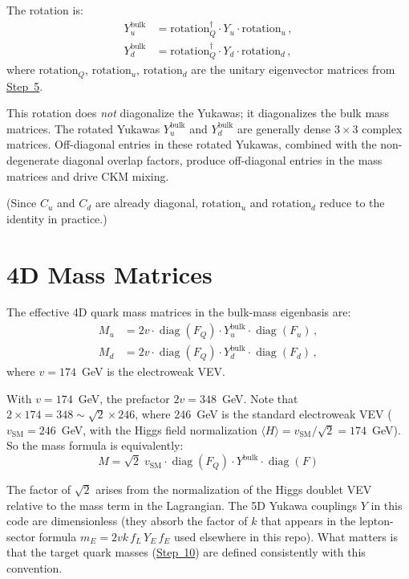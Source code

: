 \documentclass[11pt]{article}
\begin{document}
The rotation is:
\begin{align}
  Y_u^{\mathrm{bulk}} &= \text{rotation}_Q^\dagger \cdot Y_u
    \cdot \text{rotation}_u\,, \\
  Y_d^{\mathrm{bulk}} &= \text{rotation}_Q^\dagger \cdot Y_d
    \cdot \text{rotation}_d\,,
\end{align}
where $\text{rotation}_Q$, $\text{rotation}_u$, $\text{rotation}_d$ are the
unitary eigenvector matrices from \hyperref[sec:step5]{Step~5}.

This rotation does \emph{not} diagonalize the Yukawas; it diagonalizes the
bulk mass matrices.  The rotated Yukawas $Y_u^{\mathrm{bulk}}$ and
$Y_d^{\mathrm{bulk}}$ are generally dense $3\times3$ complex matrices.
Off-diagonal entries in these rotated Yukawas, combined with the non-degenerate
diagonal overlap factors, produce off-diagonal entries in the mass matrices and
drive CKM mixing.

(Since $C_u$ and $C_d$ are already diagonal, $\text{rotation}_u$ and
$\text{rotation}_d$ reduce to the identity in practice.)

\section{4D Mass Matrices}
\label{sec:step8}

The effective 4D quark mass matrices in the bulk-mass eigenbasis are:
\begin{align}
  M_u &= 2v \cdot \operatorname{diag}(F_Q) \cdot Y_u^{\mathrm{bulk}}
    \cdot \operatorname{diag}(F_u)\,, \\
  M_d &= 2v \cdot \operatorname{diag}(F_Q) \cdot Y_d^{\mathrm{bulk}}
    \cdot \operatorname{diag}(F_d)\,,
\end{align}
where $v = 174$~GeV is the electroweak VEV.

With $v = 174$~GeV, the prefactor
$2v = 348$~GeV.  Note that $2\times174 = 348 \sim \sqrt{2}\times246$, where
246~GeV is the standard electroweak VEV
($v_{\mathrm{SM}} = 246$~GeV, with the Higgs field normalization
$\langle H \rangle = v_{\mathrm{SM}}/\sqrt{2} = 174$~GeV).  So the mass
formula is equivalently:
\begin{equation}
  M = \sqrt{2}\;v_{\mathrm{SM}} \cdot \operatorname{diag}(F_Q)
    \cdot Y^{\mathrm{bulk}} \cdot \operatorname{diag}(F)
\end{equation}

The factor of $\sqrt{2}$ arises from the normalization of the Higgs doublet VEV
relative to the mass term in the Lagrangian.  The 5D Yukawa couplings $Y$ in
this code are dimensionless (they absorb the factor of $k$ that appears in the
lepton-sector formula $m_E = 2vk\,f_L\,Y_E\,f_E$ used elsewhere in this
repo).  What matters is that the target quark masses
(\hyperref[sec:step10]{Step~10}) are defined consistently with this convention.
\end{document}
